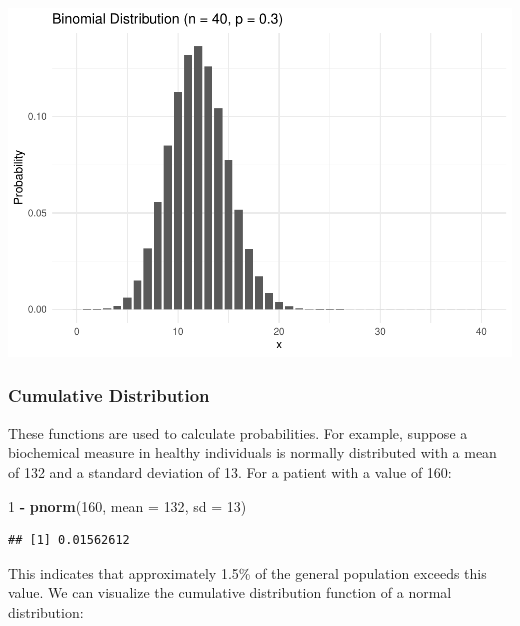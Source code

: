\documentclass[
]{article}
\newenvironment{Shaded}{\begin{snugshade}}{\end{snugshade}}
\newcommand{\AttributeTok}[1]{\textcolor[rgb]{0.13,0.29,0.53}{#1}}
\newcommand{\DecValTok}[1]{\textcolor[rgb]{0.00,0.00,0.81}{#1}}
\newcommand{\FunctionTok}[1]{\textcolor[rgb]{0.13,0.29,0.53}{\textbf{#1}}}
\newcommand{\NormalTok}[1]{#1}
\newcommand{\SpecialCharTok}[1]{\textcolor[rgb]{0.81,0.36,0.00}{\textbf{#1}}}
\begin{document}
\includegraphics{Probability-Distributions_files/figure-latex/unnamed-chunk-11-1.pdf}

\hypertarget{cumulative-distribution}{%
\subsubsection{Cumulative Distribution}\label{cumulative-distribution}}

These functions are used to calculate probabilities. For example,
suppose a biochemical measure in healthy individuals is normally
distributed with a mean of 132 and a standard deviation of 13. For a
patient with a value of 160:

\begin{Shaded}
\begin{Highlighting}[]
\DecValTok{1} \SpecialCharTok{{-}} \FunctionTok{pnorm}\NormalTok{(}\DecValTok{160}\NormalTok{, }\AttributeTok{mean =} \DecValTok{132}\NormalTok{, }\AttributeTok{sd =} \DecValTok{13}\NormalTok{)}
\end{Highlighting}
\end{Shaded}

\begin{verbatim}
## [1] 0.01562612
\end{verbatim}

This indicates that approximately 1.5\% of the general population
exceeds this value. We can visualize the cumulative distribution
function of a normal distribution:
\end{document}
